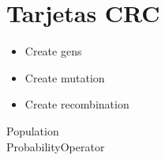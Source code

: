 \section{Tarjetas CRC}
\begin{crccard}[tb:mytable]
    \crcresp
    {
       \begin{itemize}
          \item Create gens
          \item Create mutation
          \item Create recombination
       \end{itemize}
    }
   \crccolab
   {
      Population\\
      ProbabilityOperator\\
   }
 \end{crccard}
